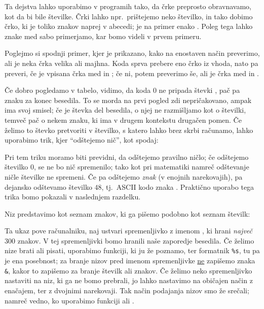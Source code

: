 Ta dejstva lahko uporabimo v programih tako, da črke preprosto obravnavamo, kot
da bi bile številke.
Črki  lahko npr.~prištejemo neko številko, in tako dobimo črko, ki je
toliko znakov naprej v abecedi;  je na primer enako .
Poleg tega lahko znake med sabo primerjamo, kar bomo videli v prvem primeru.

Poglejmo si spodnji primer, kjer je prikazano, kako na enostaven način
preverimo, ali je neka črka velika ali majhna.
Koda sprva prebere eno črko iz vhoda, nato pa preveri, če je vpisana črka med
 in ; če ni, potem preverimo še, ali je črka med  in
.


Če dobro pogledamo v tabelo, vidimo, da koda $0$ ne pripada števki , pač
pa znaku za konec besedila.
To se morda na prvi pogled zdi nepričakovano, ampak ima svoj smisel; če je
števka del besedila, o njej ne razmišljamo kot o številki, temveč pač o nekem
znaku, ki ima v drugem kontekstu drugačen pomen.
Če želimo to števko pretvoriti v številko, s katero lahko brez skrbi računamo,
lahko uporabimo trik, kjer \enquote{odštejemo nič}, kot spodaj:


Pri tem triku moramo biti previdni, da odštejemo pravilno ničlo; če odštejemo
številko $0$, se ne bo nič spremenilo; tako kot pri matematiki namreč
odštevanje ničle številke ne spremeni.
Če pa odštejemo \emph{znak}  (v enojnih narekovajih), pa dejansko
odštevamo številko $48$, tj.~ASCII kodo znaka .
Praktično uporabo tega trika bomo pokazali v naslednjem razdelku.


Niz predstavimo kot seznam znakov, ki ga pišemo podobno kot seznam številk:


Ta ukaz pove računalniku, naj ustvari spremenljivko z imenom
, ki hrani \emph{največ} $300$ znakov.
V tej spremenljivki bomo hranili naše zaporedje besedila.
Če želimo nize brati ali pisati, uporabimo funkciji, ki ju že poznamo, ter
formatnik \verb+%s+, tu pa je ena posebnost; za branje nizov pred imenom
spremenljivke \underline{ne} zapišemo znaka \verb+&+, kakor to zapišemo za
branje številk ali znakov.
Če želimo neko spremenljivko nastaviti na niz, ki ga ne bomo prebrali, jo lahko
nastavimo na običajen način z enačajem, ter z dvojnimi narekovaji.
Tak način podajanja nizov smo že srečali; namreč vedno, ko uporabimo funkciji
 ali .

